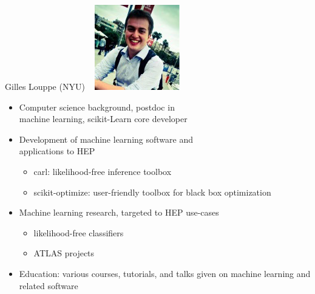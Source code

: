 \documentclass{beamer}
\begin{document}
\begin{frame}{Gilles Louppe (NYU)}
\mbox{ } \hfill \includegraphics[height=2 cm]{gilles_louppe.png}

\vspace{-2 cm}
\begin{itemize}
\item Computer science background, postdoc in \\ machine learning, scikit-Learn core developer
\item Development of machine learning software and \\ applications to HEP
\begin{itemize}
\item carl: likelihood-free inference toolbox
\item scikit-optimize: user-friendly toolbox for black box optimization
\end{itemize}

\item Machine learning research, targeted to HEP use-cases
\begin{itemize}
\item likelihood-free classifiers
\item ATLAS projects
\end{itemize}

\item Education: various courses, tutorials, and talks given on machine learning and related software
\end{itemize}
\end{frame}
\end{document}
